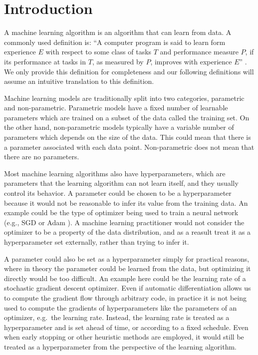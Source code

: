 \chapter{Introduction}
\label{chapter:introduction}

A machine learning algorithm is an algorithm that can learn from data. A
commonly used definition is: ``A computer program is said to learn form
experience $E$ with respect to some class of tasks $T$ and performance measure
$P$, if its performance at tasks in $T$, as measured by $P$, improves with
experience $E$'' \citep{mitchell-mldef}. We only provide this definition for
completeness and our following definitions will assume an intuitive translation
to this definition.

Machine learning models are traditionally split into two categories, parametric
and non-parametric. Parametric models have a fixed number of learnable parameters
which are trained on a subset of the data called the training set. On the other hand,
non-parametric models typically have a variable number of parameters which depends on
the size of the data. This could mean that there is a parameter associated with each
data point. Non-parametric does not mean that there are no parameters.

Most machine learning algorithms also have hyperparameters, which are
parameters that the learning algorithm can not learn itself, and they usually
control its behavior. A parameter could be chosen to be a hyperparameter
because it would not be reasonable to infer its value from the training data.
An example could be the type of optimizer being used to train a neural network
(e.g., SGD or Adam \citep{kingma2014adam}). A machine learning practitioner
would not consider the optimizer to be a property of the data distribution, and
as a reasult treat it as a hyperparameter set externally, rather than trying to
infer it.

A parameter could also be set as a hyperparameter simply for practical reasons, where in
theory the parameter could be learned from the data, but optimizing it directly
would be too difficult. An example here could be the learning rate of a
stochastic gradient descent optimizer. Even if automatic differentiation
\citep{maclaurin2015autograd} allows us to compute the gradient flow through
arbitrary code, in practice it is not being used to compute the gradients of
hyperparameters like the parameters of an optimizer, e.g.\ the learning rate.
Instead, the learning rate is treated as a hyperparameter and is set ahead of
time, or according to a fixed schedule. Even when early stopping or other
heuristic methods are employed, it would still be treated as a hyperparameter
from the perspective of the learning algorithm.

